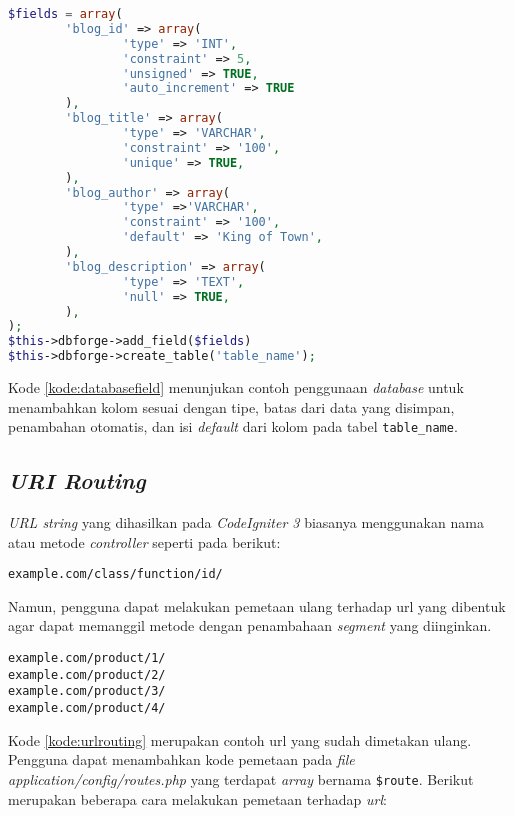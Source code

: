 \begin{lstlisting}[language=PHP, caption=Contoh menambahkan kolom dengan konfigurasinya menggunakan \textit{CodeIgniter3} , label=kode:databasefield]
	$fields = array(
        'blog_id' => array(
                'type' => 'INT',
                'constraint' => 5,
                'unsigned' => TRUE,
                'auto_increment' => TRUE
        ),
        'blog_title' => array(
                'type' => 'VARCHAR',
                'constraint' => '100',
                'unique' => TRUE,
        ),
        'blog_author' => array(
                'type' =>'VARCHAR',
                'constraint' => '100',
                'default' => 'King of Town',
        ),
        'blog_description' => array(
                'type' => 'TEXT',
                'null' => TRUE,
        ),
);
$this->dbforge->add_field($fields)
$this->dbforge->create_table('table_name');
\end{lstlisting}
Kode \ref{kode:databasefield} menunjukan contoh penggunaan \textit{database} untuk menambahkan kolom sesuai dengan tipe, batas dari data yang disimpan, penambahan otomatis, dan isi \textit{default} dari kolom pada tabel \texttt{table\_name}.

\subsection{\textit{URI Routing}}
\textit{URL string} yang dihasilkan pada \textit{CodeIgniter 3} biasanya menggunakan nama atau metode \textit{controller} seperti pada berikut:

\begin{center}
\verb|example.com/class/function/id/|
\end{center}

Namun, pengguna dapat melakukan pemetaan ulang terhadap url yang dibentuk agar dapat memanggil metode dengan penambahaan \textit{segment} yang diinginkan.

\begin{lstlisting}[caption=Contoh url yang sudah dimetakan,label=kode:urlrouting]
example.com/product/1/
example.com/product/2/
example.com/product/3/
example.com/product/4/
\end{lstlisting}

Kode \ref{kode:urlrouting} merupakan contoh url yang sudah dimetakan ulang. Pengguna dapat menambahkan kode pemetaan pada \textit{file application/config/routes.php} yang terdapat \textit{array} bernama \verb|$route|. Berikut merupakan beberapa cara melakukan pemetaan terhadap \textit{url}:

